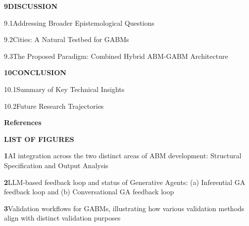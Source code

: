 \documentclass[12pt,a4paper]{report}
\begin{document}
\noindent\textbf{9\quad DISCUSSION}\dotfill\textbf{\pageref{chap:discussion}}\par
\vspace{3pt}
\noindent\hspace{0.3in}9.1\quad Addressing Broader Epistemological Questions\dotfill\pageref{sec:epist_questions}\par
\vspace{2pt}
\noindent\hspace{0.3in}9.2\quad Cities: A Natural Testbed for GABMs\dotfill\pageref{sec:cities_testbed}\par
\vspace{2pt}
\noindent\hspace{0.3in}9.3\quad The Proposed Paradigm: Combined Hybrid ABM-GABM Architecture\dotfill\pageref{sec:hybrid_architecture}\par
\vspace{6pt}

\noindent\textbf{10\quad CONCLUSION}\dotfill\textbf{\pageref{chap:conclusion}}\par
\vspace{3pt}
\noindent\hspace{0.3in}10.1\quad Summary of Key Technical Insights\dotfill\pageref{sec:conclusion_summary}\par
\vspace{2pt}
\noindent\hspace{0.3in}10.2\quad Future Research Trajectories\dotfill\pageref{sec:conclusion_future}\par
\vspace{6pt}

\noindent\textbf{References}\dotfill\textbf{\pageref{chap:references}}\par

\clearpage


\clearpage
\thispagestyle{plain}
\begin{center}
{\fontsize{18}{22}\selectfont\bfseries LIST OF FIGURES}\par
\end{center}
\vspace{0.8cm}

\noindent\textbf{1}\quad AI integration across the two distinct areas of ABM development: Structural Specification and Output Analysis\dotfill\pageref{fig:fig1_ai_in_abm}\par
\vspace{8pt}
\noindent\textbf{2}\quad LLM-based feedback loop and status of Generative Agents: (a) Inferential GA feedback loop and (b) Conversational GA feedback loop\dotfill\pageref{fig:fig2_feedback_loop}\par
\vspace{8pt}
\noindent\textbf{3}\quad Validation workflows for GABMs, illustrating how various validation methods align with distinct validation purposes\dotfill\pageref{fig:fig3_validation_workflows}\par
\end{document}
